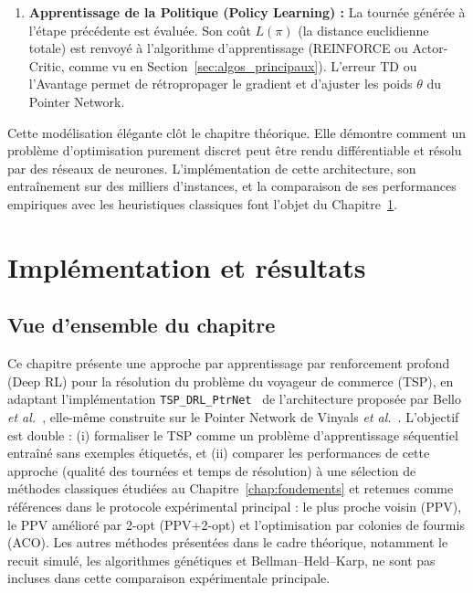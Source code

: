 \documentclass[12pt, a4paper, twoside, openright]{book}
\begin{document}
\begin{enumerate}[label=\textbf{(\alph*)}, leftmargin=*]
		\item \textbf{Apprentissage de la Politique (Policy Learning) :} La tournée générée à l'étape précédente est évaluée. Son coût $L(\pi)$ (la distance euclidienne totale) est renvoyé à l'algorithme d'apprentissage (REINFORCE ou Actor-Critic, comme vu en Section~\ref{sec:algos_principaux}). L'erreur TD ou l'Avantage permet de rétropropager le gradient et d'ajuster les poids $\theta$ du Pointer Network.
	\end{enumerate}
	
	Cette modélisation élégante clôt le chapitre théorique. Elle démontre comment un problème d'optimisation purement discret peut être rendu différentiable et résolu par des réseaux de neurones. L'implémentation de cette architecture, son entraînement sur des milliers d'instances, et la comparaison de ses performances empiriques avec les heuristiques classiques font l'objet du Chapitre~\ref{chap:impl_resultats}.
	
	

\chapter{Implémentation et résultats}
\label{chap:impl_resultats}

\section{Vue d'ensemble du chapitre}
\label{sec:ch4-overview}

Ce chapitre présente une approche par apprentissage par renforcement profond
(Deep RL) pour la résolution du problème du voyageur de commerce (TSP), en
adaptant l'implémentation \texttt{TSP\_DRL\_PtrNet}~\cite{rintarooo_repo} de
l'architecture proposée par Bello \textit{et al.}~\cite{bello2016neural},
elle-même construite sur le Pointer Network de Vinyals \textit{et al.}~\cite{vinyals2015pointer}.
L'objectif est double : (i) formaliser le TSP comme un problème d'apprentissage
séquentiel entraîné sans exemples étiquetés, et (ii) comparer les performances
de cette approche (qualité des tournées et temps de résolution) à une sélection
de méthodes classiques étudiées au Chapitre~\ref{chap:fondements} et retenues
comme références dans le protocole expérimental principal : le plus proche
voisin (PPV), le PPV amélioré par 2-opt (PPV+2-opt) et l'optimisation par
colonies de fourmis (ACO). Les autres méthodes présentées dans le cadre
théorique, notamment le recuit simulé, les algorithmes génétiques et
Bellman--Held--Karp, ne sont pas incluses dans cette comparaison expérimentale
principale.
\end{document}
